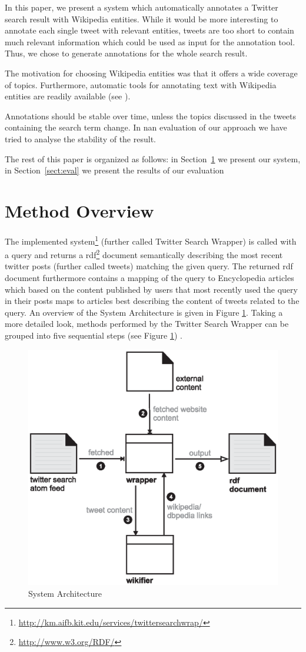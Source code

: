 \documentclass{llncs}
\begin{document}
In this paper, we present a system which automatically annotates a Twitter search result with Wikipedia entities. While it would be more interesting to annotate each single tweet with relevant entities, tweets are too short to contain much relevant information which could be used as input for the annotation tool. Thus, we chose to generate annotations for the whole search result. 

The motivation for choosing Wikipedia entities was that it offers a wide coverage of topics. Furthermore, automatic tools for annotating text with Wikipedia entities are readily available (see \cite{key:wikifier}).

Annotations should be stable over time, unless the topics discussed in the tweets containing the search term change. In nan evaluation of our approach we have tried to analyse the stability of the result.

The rest of this paper is organized as follows: in Section~\ref{sect:method} we present our system, in Section~\ref{sect:eval} we present the results of our evaluation

\section{Method Overview}
\label{sect:method}

The implemented
system\footnote{\url{http://km.aifb.kit.edu/services/twittersearchwrap/}}
(further called Twitter Search Wrapper) is called with a query and returns a
rdf\footnote{\url{http://www.w3.org/RDF/}} document semantically describing the
most recent twitter posts (further called tweets) matching the given query. The returned rdf
document furthermore contains a mapping of the query to Encyclopedia articles
which based on the content published by users that most recently used the query
in their posts maps to articles best describing the content of tweets related to
the query. An overview of the System Architecture is given in Figure
\ref{fig:arch}. Taking a more detailed look, methods performed by the Twitter
Search Wrapper can be grouped into five sequential steps (see Figure
\ref{fig:arch}) .

 
\begin{figure}[htb]
  \centering
  \includegraphics[width=.6\linewidth]{architecture}
  \caption{System Architecture}
  \label{fig:arch}
\end{figure}
\end{document}
